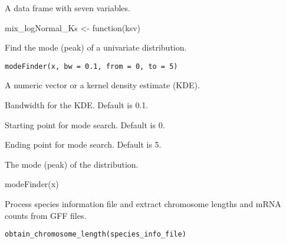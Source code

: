 \documentclass[a4paper]{book}
\begin{document}
%
\begin{Value}
A data frame with seven variables.
\end{Value}
%
\begin{Examples}
\begin{ExampleCode}
mix_logNormal_Ks <- function(ksv)

\end{ExampleCode}
\end{Examples}
%
\begin{Description}\relax
Find the mode (peak) of a univariate distribution.
\end{Description}
%
\begin{Usage}
\begin{verbatim}
modeFinder(x, bw = 0.1, from = 0, to = 5)
\end{verbatim}
\end{Usage}
%
\begin{Arguments}
\begin{ldescription}
\item[\code{x}] A numeric vector or a kernel density estimate (KDE).

\item[\code{bw}] Bandwidth for the KDE. Default is 0.1.

\item[\code{from}] Starting point for mode search. Default is 0.

\item[\code{to}] Ending point for mode search. Default is 5.
\end{ldescription}
\end{Arguments}
%
\begin{Value}
The mode (peak) of the distribution.
\end{Value}
%
\begin{Examples}
\begin{ExampleCode}
modeFinder(x)
\end{ExampleCode}
\end{Examples}
%
\begin{Description}\relax
Process species information file and extract chromosome lengths and mRNA counts from GFF files.
\end{Description}
%
\begin{Usage}
\begin{verbatim}
obtain_chromosome_length(species_info_file)
\end{verbatim}
\end{Usage}
\end{document}
